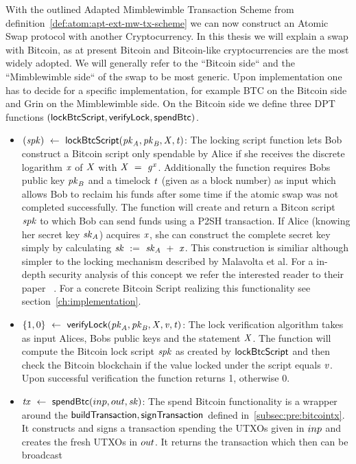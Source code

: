 With the outlined Adapted Mimblewimble Transaction Scheme from definition~\ref{def:atom:apt-ext-mw-tx-scheme} we can now construct an Atomic Swap protocol with another Cryptocurrency.
In this thesis we will explain a swap with Bitcoin, as at present Bitcoin and Bitcoin-like cryptocurrencies are the most widely adopted.
We will generally refer to the ``Bitcoin side`` and the ``Mimblewimble side`` of the swap to be most generic.
Upon implementation one has to decide for a specific implementation, for example BTC on the Bitcoin side and Grin on
the Mimblewimble side.
On the Bitcoin side we define three DPT functions $(\mathsf{lockBtcScript}, \mathsf{verifyLock}, \mathsf{spendBtc})$.
\begin{itemize}
    \item $(\mathit{spk}) ~\leftarrow~ \mathsf{lockBtcScript} (\mathit{pk}_{\mathit{A}},\mathit{pk}_{\mathit{B}},\mathit{X},\mathit{t})$:
    The locking script function lets Bob construct a Bitcoin script only spendable by Alice if she receives the discrete logarithm
    $\mathit{x}$ of $\mathit{X}$ with $\mathit{X} ~=~ \mathit{g}^{\mathit{x}}$.
    Additionally the function requires Bobs public key $\mathit{pk}_{\mathit{B}}$ and a timelock $\mathit{t}$ (given as a block
    number) as input which allows Bob to reclaim his funds after some time if the atomic swap was not
    completed successfully. The function will create and return a Bitcon script $\mathit{spk}$ to which Bob can send funds using a P2SH transaction.
    If Alice (knowing her secret key $\mathit{sk}_{\mathit{A}}$) acquires $\mathit{x}$, she can construct the complete secret key simply
    by calculating $\mathit{sk} ~:=~ \mathit{sk}_{\mathit{A}} ~+~ \mathit{x}$.
    This construction is similiar although simpler to the locking mechanism described by Malavolta et al. For a in-depth security analysis of this concept we refer the interested reader to their paper ~\cite{malavolta2019anonymous}.
    For a concrete Bitcoin Script realizing this functionality see section~\ref{ch:implementation}.
    \item $\{ 1,0 \} ~\leftarrow~ \mathsf{verifyLock} (\mathit{pk}_{\mathit{A}},\mathit{pk}_{\mathit{B}},\mathit{X},\mathit{v},\mathit{t})$:
    The lock verification algorithm takes as input Alices,
    Bobs public keys and the statement $\mathit{X}$. The function will compute the Bitcoin lock script
    $\mathit{spk}$ as created by $\mathsf{lockBtcScript}$ and then check the Bitcoin blockchain if the value locked
    under the script equals $\mathit{v}$.
    Upon successful verification the function returns 1, otherwise 0.
    \item $\mathit{tx} ~\leftarrow~ \mathsf{spendBtc}(inp,out,\mathit{sk})$:
    The spend Bitcoin functionality is a wrapper around the $\mathsf{buildTransaction}, \mathsf{signTransaction}$ defined in~\ref{subsec:pre:bitcointx}.
    It constructs and signs a transaction spending the UTXOs given in $inp$ and creates the fresh UTXOs in $out$.
    It returns the transaction which then can be broadcast
\end{itemize}

